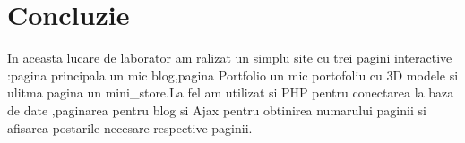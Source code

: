 \section*{Concluzie}
In aceasta lucare de laborator am ralizat un simplu site cu trei pagini interactive :pagina principala un mic blog,pagina Portfolio un mic portofoliu cu 3D modele si ulitma pagina un mini\_store.La fel am utilizat si PHP pentru conectarea la baza de date ,paginarea pentru blog si Ajax pentru obtinirea numarului paginii si afisarea postarile necesare respective paginii.

\clearpage